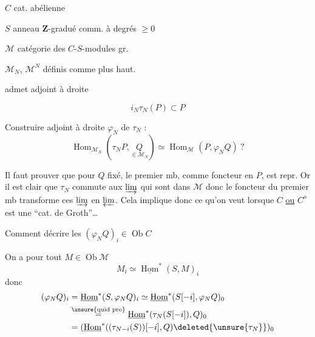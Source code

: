 $C$ cat. abélienne

$S$ anneau $\mathbf Z$-gradué comm. à degrés $\geq0$

$\mathcal M$  catégorie des $C$-$S$-modules gr. \uline{}

$\mathcal M_N$, $\mathcal M^N$ définis comme plus haut.


admet  adjoint à droite

\[ i_N\tau_N(P)\subset P \]


Construire adjoint à droite $\varphi_N$ de $\tau_N$ :
\[
\operatorname{Hom}_{\mathcal M_N}(\tau_NP,\underset{\in\mathcal M_N}{Q})\simeq
\operatorname{Hom}_{\mathcal M}(P,\varphi_NQ)\ ?
\]

Il faut  prouver que pour $Q$ fixé, le premier mb, comme foncteur en $P$, est repr. Or il est clair que $\tau_N$ commute aux $\varinjlim$ qui sont  dans $\mathcal M$ donc le foncteur du premier mb transforme ces $\varinjlim$ en $\varprojlim$. Cela implique donc ce qu'on veut lorsque $C$ \uline{ou} $C^o$ est une ``cat. de Groth''\ldots

Comment  décrire les $(\varphi_NQ)_i\in\operatorname{Ob}C$

On a pour tout $M\in\operatorname{Ob}\mathcal M$
\[ M_i\simeq\underline{\operatorname{Hom}}^*(S,M)_i \]
donc
\[
\begin{aligned}
(\varphi_NQ)_i&=\underline{\operatorname{Hom}}^*(S,\varphi_NQ)_i
\simeq\underline{\operatorname{Hom}}^*(S[-i],\varphi_NQ)_0\\
&\overset{\unsure{\text{quid pro}}}{=}\underline{\operatorname{Hom}}^*(\tau_N(S[-i]),Q)_0\\
&=(\underline{\operatorname{Hom}}^*((\tau_{N-i}(S))[-i],Q)\deleted{\unsure{\tau_N}})_0
\end{aligned}
\]
